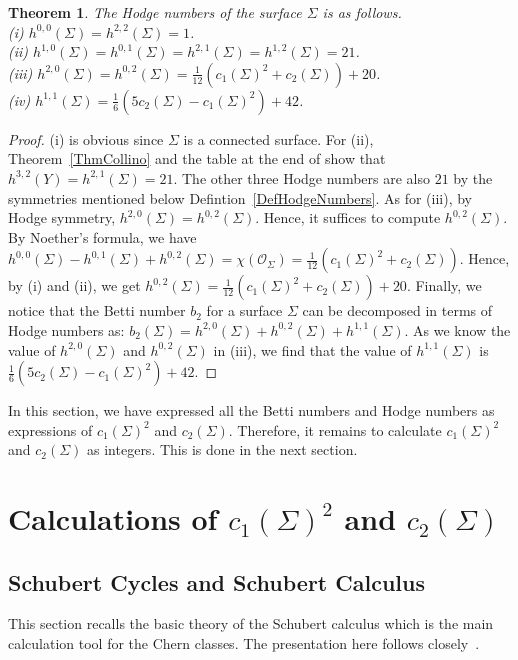 \documentclass{article}
\newtheorem{theorem}{Theorem}[section]
\theoremstyle{definition}
\begin{document}
\begin{theorem}\label{ThmHodgeAndChern}
    The Hodge numbers of the surface $\Sigma$ is as follows.\\
    (i) $h^{0, 0}(\Sigma) = h^{2, 2}(\Sigma) = 1$.\\
    (ii) $h^{1, 0}(\Sigma) = h^{0, 1}(\Sigma) = h^{2, 1}(\Sigma) = h^{1, 2}(\Sigma) = 21$.\\
    (iii) $h^{2, 0}(\Sigma) = h^{0, 2}(\Sigma) = \frac{1}{12}(c_1(\Sigma)^2 + c_2(\Sigma)) + 20$.\\
    (iv) $h^{1, 1}(\Sigma) = \frac{1}{6}(5c_2(\Sigma) - c_1(\Sigma)^2) + 42$.
\end{theorem}
\begin{proof}
    (i) is obvious since $\Sigma$ is a connected surface. For (ii), Theorem~\ref{ThmCollino} and the table at the end of \cite[Section 1.4]{HuybrechtsCubic} show that $h^{3,2}(Y) = h^{2,1}(\Sigma) = 21$. The other three Hodge numbers are also $21$ by the symmetries mentioned below Defintion~\ref{DefHodgeNumbers}. As for (iii), by Hodge symmetry, $h^{2, 0}(\Sigma) = h^{0, 2}(\Sigma) $. Hence, it suffices to compute $h^{0, 2}(\Sigma)$. By Noether's formula, we have $h^{0, 0}(\Sigma) - h^{0, 1}(\Sigma) + h^{0, 2}(\Sigma) = \chi(\mathcal O_\Sigma) = \frac{1}{12}(c_1(\Sigma)^2 + c_2(\Sigma))$. Hence, by (i) and (ii), we get $h^{0, 2}(\Sigma) =  \frac{1}{12}(c_1(\Sigma)^2 + c_2(\Sigma)) + 20$. Finally, we notice that the Betti number \( b_2 \) for a surface \(\Sigma\) can be decomposed in terms of Hodge numbers as: $b_2(\Sigma) = h^{2,0}(\Sigma) + h^{0,2}(\Sigma) + h^{1,1}(\Sigma)$. As we know the value of $h^{2,0}(\Sigma)$ and $h^{0,2}(\Sigma)$ in (iii), we find that the value of $h^{1,1}(\Sigma)$ is $\frac{1}{6}(5c_2(\Sigma) - c_1(\Sigma)^2) + 42$.
\end{proof}

In this section, we have expressed all the Betti numbers and Hodge numbers as expressions of $c_1(\Sigma)^2$ and $c_2(\Sigma)$. Therefore, it remains to calculate $c_1(\Sigma)^2$ and $c_2(\Sigma)$ as integers. This is done in the next section.

\section{Calculations of $c_1(\Sigma)^2$ and $c_2(\Sigma)$}\label{SectionChernCalculations}

\subsection{Schubert Cycles and Schubert Calculus}\label{SubsectionSchubert}
This section recalls the basic theory of the Schubert calculus which is the main calculation tool for the Chern classes. The presentation here follows closely~\cite{Fulton}.
\end{document}
